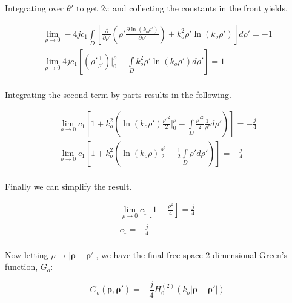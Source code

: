 \noindent Integrating over $\theta'$ to get $2\pi$ and collecting the constants in the front yields.

\begin{equation}
\begin{gathered}
\lim_{\rho\to 0}-4jc_1\int\limits_{D} \left[\frac{\partial}{\partial \rho'}\left(\rho' \frac{\partial \ln(k_o\rho')}{\partial \rho'} \right) + k_o^2\rho'\ln(k_o\rho')\right] d\rho' = -1 \\
\lim_{\rho\to 0}4jc_1\left[\left(\rho' \frac{1 }{\rho'} \right)\bigg|_0^{\rho} + \int\limits_{D}k_o^2\rho'\ln(k_o\rho') d\rho'\right] = 1 \\
\end{gathered}
\label{gf_eq:39a}
\end{equation}
\renewcommand{\baselinestretch}{2} \small\normalsize

\noindent Integrating the second term by parts results in the following.

\begin{equation}
\begin{gathered}
\lim_{\rho\to 0}c_1\left[ 1 +  k_o^2\left( \ln(k_o\rho')\frac{\rho'^2}{2}\bigg|_0^{\rho} - \int\limits_{D}\frac{\rho'^2}{2}\frac{1}{\rho'} d\rho' \right)\right] = -\frac{j}{4} \\
\lim_{\rho\to 0}c_1\left[ 1 +  k_o^2\left( \ln(k_o\rho)\frac{\rho^2}{2} - \frac{1}{2}\int\limits_{D}\rho' d\rho' \right)\right] = -\frac{j}{4} \\
\end{gathered}
\label{gf_eq:39c}
\end{equation}
\renewcommand{\baselinestretch}{2} \small\normalsize

\noindent Finally we can simplify the result.

\begin{equation}
\begin{gathered}
\lim_{\rho\to 0}c_1\left[ 1 - \frac{\rho^2}{4}\right] = \frac{j}{4} \\
c_1 = -\frac{j}{4}\\
\end{gathered}
\label{gf_eq:39d}
\end{equation}
\renewcommand{\baselinestretch}{2} \small\normalsize

Now letting $\rho \rightarrow |\boldsymbol{\rho}-\boldsymbol{\rho}'|$, we have the final free space 2-dimensional Green's function, $G_o$:

\begin{equation}
\boxed{G_o\left(\boldsymbol{\rho},\boldsymbol{\rho}'\right) = -\frac{j}{4}H_0^{(2)}\left(k_o|\boldsymbol{\rho} - \boldsymbol{\rho}' | \right)}
\label{gf_eq:40}
\end{equation}
\renewcommand{\baselinestretch}{2} \small\normalsize


